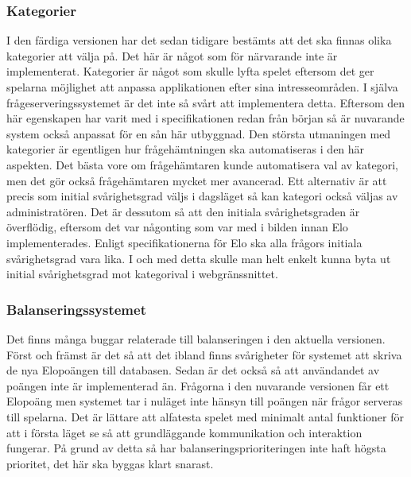 \documentclass[a4paper, 11pt]{article}
\begin{document}
\subsubsection{Kategorier}
I den färdiga versionen har det sedan tidigare bestämts att det ska finnas olika kategorier att välja på. Det här är något som för närvarande inte är implementerat. Kategorier är något som skulle lyfta spelet eftersom det ger spelarna möjlighet att anpassa applikationen efter sina intresseområden. I själva frågeserveringssystemet är det inte så svårt att implementera detta. Eftersom den här egenskapen har varit med i specifikationen redan från början så är nuvarande system också anpassat för en sån här utbyggnad. Den största utmaningen med kategorier är egentligen hur frågehämtningen ska automatiseras i den här aspekten. Det bästa vore om frågehämtaren kunde automatisera val av kategori, men det gör också frågehämtaren mycket mer avancerad. Ett alternativ är att precis som initial svårighetsgrad väljs i dagsläget så kan kategori också väljas av administratören. Det är dessutom så att den initiala svårighetsgraden är överflödig, eftersom det var någonting som var med i bilden innan Elo implementerades. Enligt specifikationerna för Elo ska alla frågors initiala svårighetsgrad vara lika. I och med detta skulle man helt enkelt kunna byta ut initial svårighetsgrad mot kategorival i webgränssnittet.

\subsubsection{Balanseringssystemet}
Det finns många buggar relaterade till balanseringen i den aktuella versionen. Först och främst är det så att det ibland finns svårigheter för systemet att skriva de nya Elopoängen till databasen. Sedan är det också så att användandet av poängen inte är implementerad än. Frågorna i den nuvarande versionen får ett Elopoäng men systemet tar i nuläget inte hänsyn till poängen när frågor serveras till spelarna. Det är lättare att alfatesta spelet med minimalt antal funktioner för att i första läget se så att grundläggande kommunikation och interaktion fungerar. På grund av detta så har balanseringsprioriteringen inte haft högsta prioritet, det här ska byggas klart snarast. 
\end{document}
